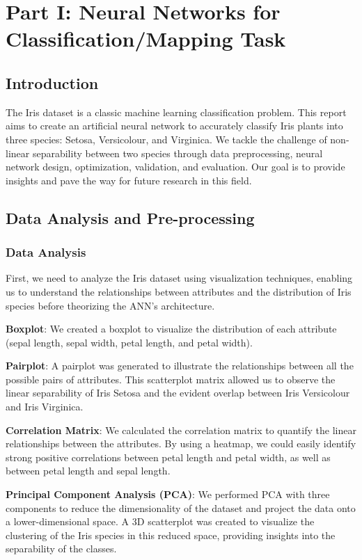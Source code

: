 \documentclass[conference]{inc/IEEEtran}
\begin{document}
\section{Part I: Neural Networks for Classification/Mapping Task}

\subsection{Introduction}

The Iris dataset is a classic machine learning classification problem. This report aims to create an artificial neural
network to accurately classify Iris plants into three species: Setosa, Versicolour, and Virginica. We tackle the
challenge of non-linear separability between two species through data preprocessing, neural network design, optimization, 
validation, and evaluation. Our goal is to provide insights and pave the way for future research in this field.

\subsection{Data Analysis and Pre-processing}

\subsubsection{Data Analysis}
First, we need to analyze the Iris dataset using visualization techniques, enabling us to understand the relationships between attributes and the distribution of Iris species before theorizing the ANN's architecture.

\textbf{Boxplot}: We created a boxplot to visualize the distribution of each attribute (sepal length, sepal width,
  petal length, and petal width).

\textbf{Pairplot}: A pairplot was generated to illustrate the relationships between all the possible pairs of attributes.
  This scatterplot matrix allowed us to observe the linear separability of Iris Setosa and the evident overlap between
  Iris Versicolour and Iris Virginica.

\textbf{Correlation Matrix}: We calculated the correlation matrix to quantify the linear relationships between the attributes.
  By using a heatmap, we could easily identify strong positive correlations between petal length and petal width, as well as
  between petal length and sepal length.

\textbf{Principal Component Analysis (PCA)}: We performed PCA with three components to reduce the dimensionality of the dataset
  and project the data onto a lower-dimensional space. A 3D scatterplot was created to visualize the clustering of the Iris
  species in this reduced space, providing insights into the separability of the classes.
\end{document}
